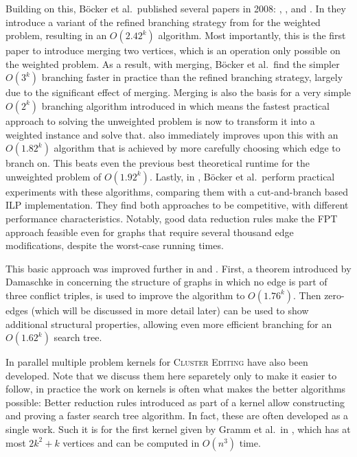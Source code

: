 \documentclass{article}
\begin{document}
Building on this, Böcker et al.\ published several papers in 2008: \cite{AnApproach},
\cite{GoingWeighted}, and \cite{ExactAlgos}. In \cite{AnApproach} they introduce a variant of the
refined branching strategy from \cite{Gramm} for the weighted problem, resulting in an $O(2.42^k)$
algorithm. Most importantly, this is the first paper to introduce merging two vertices, which is an
operation only possible on the weighted problem. As a result, with merging, Böcker et al.\ find the
simpler $O(3^k)$ branching faster in practice than the refined branching strategy, largely due to
the significant effect of merging. Merging is also the basis for a very simple $O(2^k)$ branching
algorithm introduced in \cite{GoingWeighted} which means the fastest practical approach to solving the
unweighted problem is now to transform it into a weighted instance and solve that.
\cite{GoingWeighted} also immediately improves upon this with an $O(1.82^k)$ algorithm that is
achieved by more carefully choosing which edge to branch on. This beats even the previous best
theoretical runtime for the unweighted problem of $O(1.92^k)$. Lastly, in \cite{ExactAlgos}, Böcker
et al.\ perform practical experiments with these algorithms, comparing them with a cut-and-branch
based ILP implementation. They find both approaches to be competitive, with different performance
characteristics. Notably, good data reduction rules make the FPT approach feasible even for graphs
that require several thousand edge modifications, despite the worst-case running times.

This basic approach was improved further in \cite[Böcker and Damaschke, 2011]{EvenFaster} and
\cite[Böcker, 2012]{GoldenRatio}. First, a theorem introduced by Damaschke in \cite{BoundedDegree}
concerning the structure of graphs in which no edge is part of three conflict triples, is used to
improve the algorithm to $O(1.76^k)$. Then zero-edges (which will be discussed in more detail later)
can be used to show additional structural properties, allowing even more efficient branching for an
$O(1.62^k)$ search tree.

In parallel multiple problem kernels for \textsc{Cluster Editing} have also been developed. Note
that we discuss them here separetely only to make it easier to follow, in practice the work on
kernels is often what makes the better algorithms possible: Better reduction rules introduced as
part of a kernel allow constructing and proving a faster search tree algorithm. In fact, these are
often developed as a single work. Such it is for the first kernel given by Gramm et al.\ in
\cite{Gramm}, which has at most $2k^2 + k$ vertices and can be computed in $O(n^3)$ time.
\end{document}
